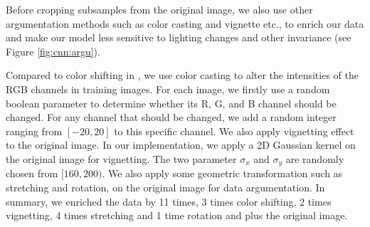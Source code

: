 Before cropping subsamples from the original image, we also use other argumentation methods such as color casting and vignette etc., to enrich our data and make our model less sensitive to lighting changes and other invariance (see Figure \ref{fig:cnn:argu}). 

Compared to color shifting in \cite{krizhevsky2012imagenet}, we use color casting to alter the intensities of the RGB channels in training images. For each image, we firstly use a random boolean parameter to determine whether its R, G, and B channel should be changed. For any channel that should be changed, we add a random integer ranging from $[-20 , 20]$ to this specific channel. We also apply vignetting effect to the original image. In our implementation, we apply a 2D Gaussian kernel on the original image for vignetting. The two parameter $\sigma_x$ and $\sigma_y$ are randomly chosen from $[160,200)$. We also apply some geometric transformation such as stretching and rotation, on the original image for data argumentation. In summary, we enriched the data by 11 times, 3 times color shifting, 2 times vignetting, 4 times stretching and 1 time rotation and plus the original image.






